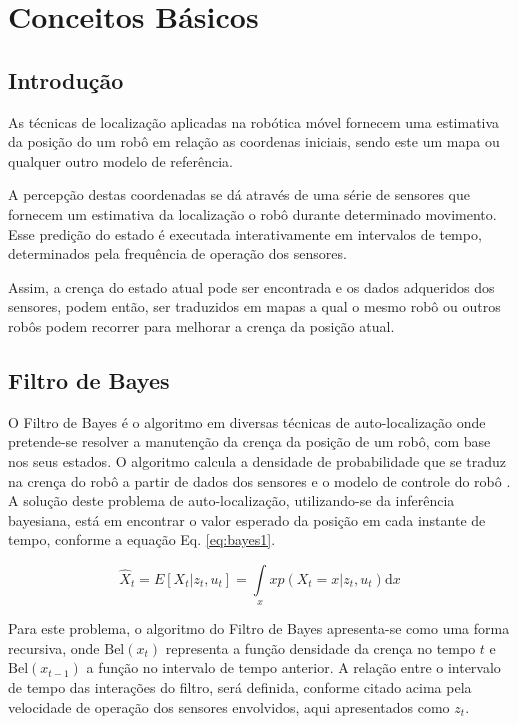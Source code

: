 \chapter{Conceitos Básicos}

 
\section{Introdução}\label{intro}

As técnicas de localização aplicadas na robótica móvel fornecem uma estimativa da posição do um robô em relação as coordenas iniciais, sendo este um mapa ou qualquer outro modelo de referência.

A percepção destas coordenadas se dá através de uma série de sensores que fornecem um estimativa da localização o robô durante determinado movimento. Esse predição do estado é executada interativamente em intervalos de tempo, determinados pela frequência de operação dos sensores. 

Assim, a crença do estado atual pode ser encontrada e os dados adqueridos dos sensores, podem então, ser traduzidos em mapas a qual o mesmo robô ou outros robôs podem recorrer para melhorar a crença da posição atual.

\section{Filtro de Bayes}

O Filtro de Bayes é o algoritmo em diversas técnicas de auto-localização onde pretende-se resolver a manutenção da crença da posição de um robô, com base nos seus estados. O algoritmo calcula a densidade de probabilidade que se traduz na crença do robô a partir de dados dos sensores e o modelo de controle do robô  \cite{thrun2006probalistic}. A solução deste problema de auto-localização, utilizando-se da inferência bayesiana, está em encontrar o valor esperado da posição em cada instante de tempo, conforme a equação Eq. \ref{eq:bayes1}.

\begin{equation}
    \label{eq:bayes1}
    \hat X_t = E\left[X_t| z_t, u_t\right] = \displaystyle \int\limits_x x p(X_t = x| z_t, u_t)\text{d}x
\end{equation}


Para este problema, o algoritmo do Filtro de Bayes apresenta-se como uma forma recursiva, onde $\text{Bel}(x_t)$ representa a função densidade da crença no tempo $t$ e $\text{Bel}(x_{t-1})$ a função no intervalo de tempo anterior. A relação entre o intervalo de tempo das interações do filtro, será definida, conforme citado acima pela velocidade de operação dos sensores envolvidos, aqui apresentados como $z_t$.

